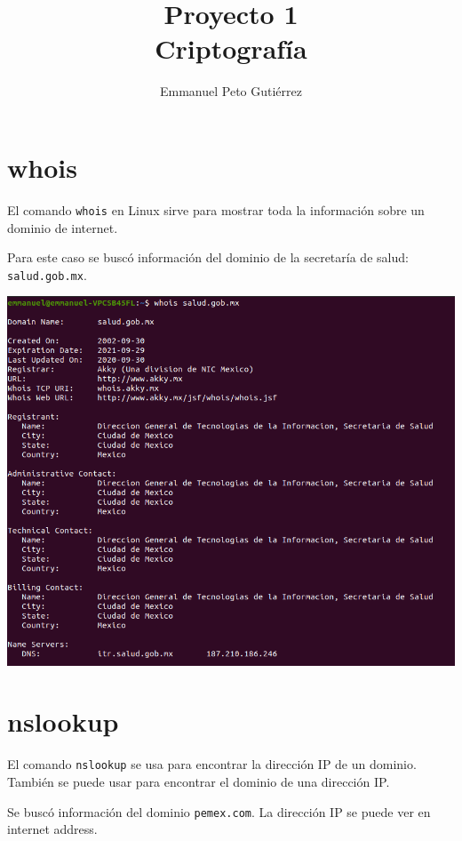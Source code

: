 \documentclass{article}
\title{Proyecto 1\\Criptografía}
\author{Emmanuel Peto Gutiérrez}
\begin{document}
\maketitle

\section{whois}

El comando \texttt{whois} en Linux sirve para mostrar toda la información sobre un dominio de internet.

Para este caso se buscó información del dominio de la secretaría de salud: \texttt{salud.gob.mx}.

\includegraphics[width=\linewidth]{imagenes/whois_ss}

\section{nslookup}

El comando \texttt{nslookup} se usa para encontrar la dirección IP de un dominio. También se puede usar para encontrar el dominio de una dirección IP.

Se buscó información del dominio \texttt{pemex.com}. La dirección IP se puede ver en internet address.
\end{document}
